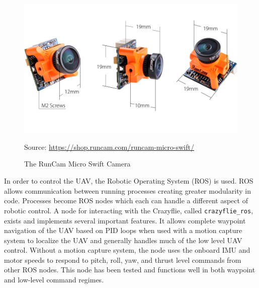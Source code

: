 \documentclass[12pt]{article}
\begin{document}
\begin{figure}
	\centering
	\includegraphics[scale=0.2]{micro-swift-size}
	\caption[The RunCam Micro Swift Camera]{The RunCam Micro Swift Camera}
	\vspace{8pt}
	\small Source: \url{https://shop.runcam.com/runcam-micro-swift/}
	\label{crazyflie_cam}
\end{figure}

In order to control the UAV, the Robotic Operating System (ROS) is used. ROS allows communication between running processes creating greater modularity in code. Processes become ROS nodes which each can handle a different aspect of robotic control. A node for interacting with the Crazyflie, called \verb|crazyflie_ros|\cite{crazyflie_ros}, exists and implements several important features. It allows complete waypoint navigation of the UAV based on PID loops when used with a motion capture system to localize the UAV and generally handles much of the low level UAV control. Without a motion capture system, the node uses the onboard IMU and motor speeds to respond to pitch, roll, yaw, and thrust level commands from other ROS nodes. This node has been tested and functions well in both waypoint and low-level command regimes. 
\end{document}
